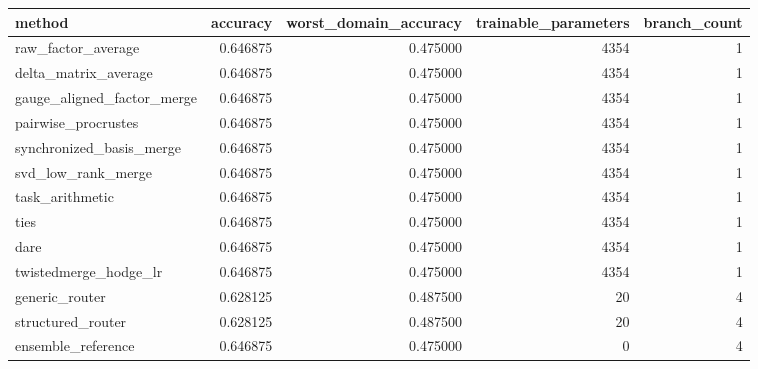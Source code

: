 \begin{tabular}{lrrrr}
\toprule
method & accuracy & worst_domain_accuracy & trainable_parameters & branch_count \\
\midrule
raw_factor_average & 0.646875 & 0.475000 & 4354 & 1 \\
delta_matrix_average & 0.646875 & 0.475000 & 4354 & 1 \\
gauge_aligned_factor_merge & 0.646875 & 0.475000 & 4354 & 1 \\
pairwise_procrustes & 0.646875 & 0.475000 & 4354 & 1 \\
synchronized_basis_merge & 0.646875 & 0.475000 & 4354 & 1 \\
svd_low_rank_merge & 0.646875 & 0.475000 & 4354 & 1 \\
task_arithmetic & 0.646875 & 0.475000 & 4354 & 1 \\
ties & 0.646875 & 0.475000 & 4354 & 1 \\
dare & 0.646875 & 0.475000 & 4354 & 1 \\
twistedmerge_hodge_lr & 0.646875 & 0.475000 & 4354 & 1 \\
generic_router & 0.628125 & 0.487500 & 20 & 4 \\
structured_router & 0.628125 & 0.487500 & 20 & 4 \\
ensemble_reference & 0.646875 & 0.475000 & 0 & 4 \\
\bottomrule
\end{tabular}
